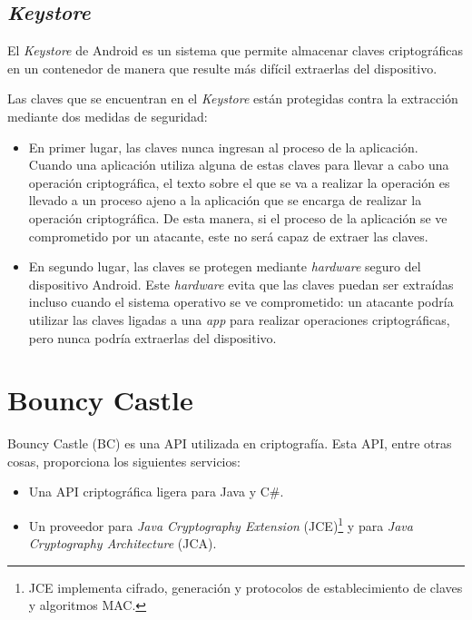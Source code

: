 \subsection{\emph{Keystore}}

\label{Keystore}

El \emph{Keystore} de Android es un sistema que permite almacenar claves criptográficas en un contenedor de manera que resulte más difícil extraerlas del dispositivo.

Las claves que se encuentran en el \emph{Keystore} están protegidas contra la extracción mediante dos medidas de seguridad:

\begin{itemize}
  \item En primer lugar, las claves nunca ingresan al proceso de la aplicación. Cuando una aplicación utiliza alguna de estas claves para llevar a cabo una operación criptográfica, el texto sobre el que se va a realizar la operación es llevado a un proceso ajeno a la aplicación que se encarga de realizar la operación criptográfica. De esta manera, si el proceso de la aplicación se ve comprometido por un atacante, este no será capaz de extraer las claves.

  \item En segundo lugar, las claves se protegen mediante \emph{hardware} seguro del dispositivo Android. Este \emph{hardware} evita que las claves puedan ser extraídas incluso cuando el sistema operativo se ve comprometido: un atacante podría utilizar las claves ligadas a una \emph{app} para realizar operaciones criptográficas, pero nunca podría extraerlas del dispositivo.
\end{itemize}

\emph{\parencite{Reference33}}


\section{Bouncy Castle}

Bouncy Castle (BC) es una API utilizada en criptografía. Esta API, entre otras cosas, proporciona los siguientes servicios:
\begin{itemize}
  \item Una API criptográfica ligera para Java y C\#.
  \item Un proveedor para \emph{Java Cryptography Extension} (JCE)\footnote{JCE implementa cifrado, generación y protocolos de establecimiento de claves y algoritmos MAC.} y para \emph{Java Cryptography Architecture} (JCA).
\end{itemize}

